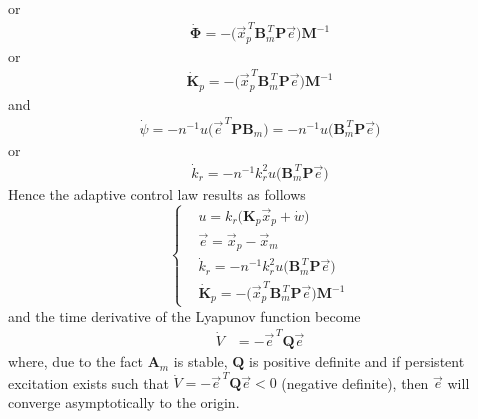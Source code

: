 \documentclass[11pt,a4paper,oneside]{book}
\numberwithin{equation}{section}
\theoremstyle{it}
\theoremstyle{definition}
\begin{document}
or
\begin{equation}
	\begin{aligned}
		\dot{\mathbf{\Phi}} = -\Big(\vec{x}_p^{\,T}\mathbf{B}_m^{\,T}\mathbf{P}\vec{e}\Big)\mathbf{M}^{-1}
	\end{aligned}
\end{equation}
or 
\begin{equation}
	\begin{aligned}
		\dot{\mathbf{K}}_p = -\Big(\vec{x}_p^{\,T}\mathbf{B}_m^{\,T}\mathbf{P}\vec{e}\Big)\mathbf{M}^{-1}
	\end{aligned}
\end{equation}
and
\begin{equation}
	\begin{aligned}
		\dot{\psi} = -n^{-1} u \Big(\vec{e}^{\,T}\mathbf{P}\mathbf{B}_m\Big) = -n^{-1} u \Big(\mathbf{B}_m^{\,T}\mathbf{P}\vec{e}\Big)
	\end{aligned}
\end{equation}
or 
\begin{equation}
	\begin{aligned}
		\dot{k}_r = -n^{-1}k_r^2 u \Big(\mathbf{B}_m^{\,T}\mathbf{P}\vec{e}\Big)
	\end{aligned}
\end{equation}
Hence the adaptive control law results as follows 
\begin{equation}
	\left\lbrace \begin{aligned}
		&u = k_r\big(\mathbf{K}_p\vec{x}_p + \dot{w}\big) \\[6pt]
		&\vec{e} = \vec{x}_p-\vec{x}_m \\[6pt]
		&\dot{k}_r = -n^{-1}k_r^2 u \Big(\mathbf{B}_m^{\,T}\mathbf{P}\vec{e}\Big) \\[6pt]
		&\dot{\mathbf{K}}_p = -\Big(\vec{x}_p^{\,T}\mathbf{B}_m^{\,T}\mathbf{P}\vec{e}\Big)\mathbf{M}^{-1}
	\end{aligned}\right. 
\end{equation}
and the time derivative of the Lyapunov function become 
\begin{equation}\label{eq_ctrl_10}
	\begin{aligned}
		\dot{V} &= -\vec{e}^{\,T}\mathbf{Q}\vec{e}
	\end{aligned}
\end{equation}
where, due to the fact $\mathbf{A}_m$ is stable, $\mathbf{Q}$ is positive definite and if persistent excitation exists such that $\dot{V}=-\vec{e}^{\,T}\mathbf{Q}\vec{e}<0$ (negative definite), then $\vec{e}$ will converge asymptotically to the origin.
\end{document}
